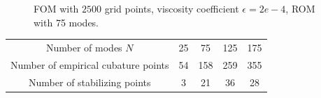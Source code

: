 \documentclass[compress]{beamer}
\theoremstyle{plain}
\begin{document}
{\begin{figure}
{\caption*{\footnotesize FOM with $2500$ grid points, viscosity coefficient $\epsilon = 2e-4$, ROM with 75 modes.}
}
\end{figure}
\vspace{-.5em}
\begin{table}[!h]
\centering
\begin{tabular}{|c || c | c | c |c |}
\hline
Number of modes $N$ & 25 & 75 & 125 & 175\\
\hhline{|=|=|=|=|=|}
Number of empirical cubature points &54 & 158 & 259 &355 \\
\hline
Number of stabilizing points & 3& 21 & 36 & 28 \\
\hline
\end{tabular}
\label{tab:hrpts}
\end{table}
}
\end{document}
